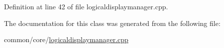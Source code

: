Definition at line 42 of file logicaldisplaymanager.\+cpp.


\begin{DoxyCode}{0}
\end{DoxyCode}


The documentation for this class was generated from the following file\+:\begin{DoxyCompactItemize}
\item 
common/core/\mbox{\hyperlink{logicaldisplaymanager_8cpp}{logicaldisplaymanager.\+cpp}}\end{DoxyCompactItemize}
